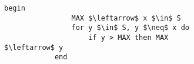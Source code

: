 \documentclass{subfiles}
\begin{document}
\begin{figure}[!h]
    \centering
    \begin{subfigure}[b]{0.45\textwidth}
        \begin{lstlisting}[language = algol]
            begin
                MAX $\leftarrow$ x $\in$ S
                for y $\in$ S, y $\neq$ x do
                    if y > MAX then MAX $\leftarrow$ y
            end
            
        \end{lstlisting}
    \end{subfigure}
\end{figure}
\end{document}
